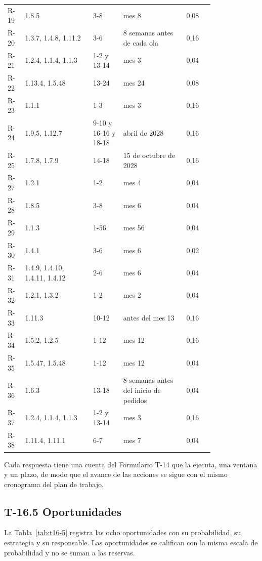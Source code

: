 \documentclass[11pt]{article}
\begin{document}
\begin{longtable}{p{0.060\linewidth}p{0.270\linewidth}p{0.120\linewidth}p{0.250\linewidth}p{0.110\linewidth}}
R-19 & 1.8.5 & 3-8 & mes 8 & 0,08 \\
R-20 & 1.3.7, 1.4.8, 1.11.2 & 3-6 & 8 semanas antes de cada ola & 0,16 \\
R-21 & 1.2.4, 1.1.4, 1.1.3 & 1-2 y 13-14 & mes 3 & 0,04 \\
R-22 & 1.13.4, 1.5.48 & 13-24 & mes 24 & 0,08 \\
R-23 & 1.1.1 & 1-3 & mes 3 & 0,16 \\
R-24 & 1.9.5, 1.12.7 & 9-10 y 16-16 y 18-18 & abril de 2028 & 0,16 \\
R-25 & 1.7.8, 1.7.9 & 14-18 & 15 de octubre de 2028 & 0,16 \\
R-27 & 1.2.1 & 1-2 & mes 4 & 0,04 \\
R-28 & 1.8.5 & 3-8 & mes 6 & 0,04 \\
R-29 & 1.1.3 & 1-56 & mes 56 & 0,04 \\
R-30 & 1.4.1 & 3-6 & mes 6 & 0,02 \\
R-31 & 1.4.9, 1.4.10, 1.4.11, 1.4.12 & 2-6 & mes 6 & 0,04 \\
R-32 & 1.2.1, 1.3.2 & 1-2 & mes 2 & 0,04 \\
R-33 & 1.11.3 & 10-12 & antes del mes 13 & 0,16 \\
R-34 & 1.5.2, 1.2.5 & 1-12 & mes 12 & 0,16 \\
R-35 & 1.5.47, 1.5.48 & 1-12 & mes 12 & 0,04 \\
R-36 & 1.6.3 & 13-18 & 8 semanas antes del inicio de pedidos & 0,04 \\
R-37 & 1.2.4, 1.1.4, 1.1.3 & 1-2 y 13-14 & mes 3 & 0,16 \\
R-38 & 1.11.4, 1.11.1 & 6-7 & mes 7 & 0,04 \\
\end{longtable}

Cada respuesta tiene una cuenta del Formulario T-14 que la ejecuta, una ventana y un plazo, de modo que el avance de las acciones se sigue con el mismo cronograma del plan de trabajo.

\subsection{T-16.5 Oportunidades}

La Tabla~\mbox{\ref{tab:t16-5}} registra las ocho oportunidades con su probabilidad, su estrategia y su responsable. Las oportunidades se califican con la misma escala de probabilidad y no se suman a las reservas.
\end{document}
